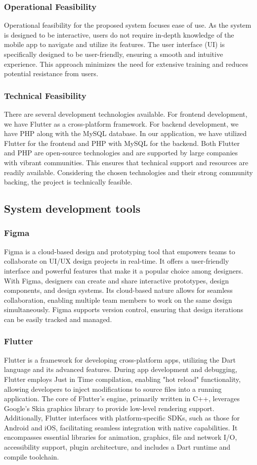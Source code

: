 \documentclass{article}
\begin{document}
\subsubsection{Operational Feasibility}
Operational feasibility for the proposed system focuses ease of use. As the system is designed to be interactive, users do not require in-depth knowledge of the mobile app to navigate and utilize its features. The user interface (UI) is specifically designed to be user-friendly, ensuring a smooth and intuitive experience. This approach minimizes the need for extensive training and reduces potential resistance from users.  
\subsubsection{Technical Feasibility}
There are several development technologies available. For frontend development, we have Flutter as a cross-platform framework. For backend development, we have PHP along with the MySQL database. In our application, we have utilized Flutter for the frontend and PHP with MySQL for the backend. Both Flutter and PHP are open-source technologies and are supported by large companies with vibrant communities. This ensures that technical support and resources are readily available. Considering the chosen technologies and their strong community backing, the project is technically feasible.
\subsection{System development tools}
\subsubsection{Figma}
Figma is a cloud-based design and prototyping tool that empowers teams to collaborate on UI/UX design projects in real-time. It offers a user-friendly interface and powerful features that make it a popular choice among designers. With Figma, designers can create and share interactive prototypes, design components, and design systems. Its cloud-based nature allows for seamless collaboration, enabling multiple team members to work on the same design simultaneously. Figma supports version control, ensuring that design iterations can be easily tracked and managed. 
\subsubsection{Flutter}
Flutter is a framework for developing cross-platform apps, utilizing the Dart language and its advanced features. During app development and debugging, Flutter employs Just in Time compilation, enabling "hot reload" functionality, allowing developers to inject modifications to source files into a running application. The core of Flutter's engine, primarily written in C++, leverages Google's Skia graphics library to provide low-level rendering support. Additionally, Flutter interfaces with platform-specific SDKs, such as those for Android and iOS, facilitating seamless integration with native capabilities. It encompasses essential libraries for animation, graphics, file and network I/O, accessibility support, plugin architecture, and includes a Dart runtime and compile toolchain.
\end{document}
